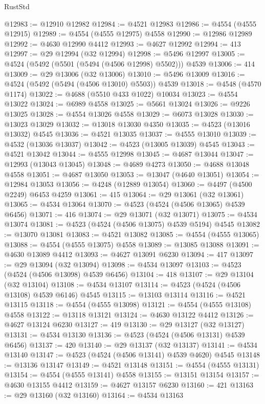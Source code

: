 \begin{lexlean}{RustStd}
\begin{coremodule}
@12983 := @12910 @12982
@12984 := @4521 @12983
@12986 := @4554 (@4555 @12915)
@12989 := @4554 (@4555 @12975) @4558
@12990 := @12986 @12989
@12992 := @4630 @12990 @4412
@12993 := @4627 @12992
@12994 := 413
@12997 := @29 @12994 (@32 @12994)
@12998 := @5496 @12997
@13005 := @4524 (@5492 (@5501 (@5494 (@4506 @12998) @5502))) @4539
@13006 := 414
@13009 := @29 @13006 (@32 @13006)
@13010 := @5496 @13009
@13016 := @4524 (@5492 (@5494 (@4506 @13010) @5503)) @4539
@13018 := @4548 (@4570 @1174)
@13022 := @4688 (@5510 @433 @1022) @10034
@13023 := @4554 @13022
@13024 := @6989 @4558
@13025 := @5661 @13024
@13026 := @9226 @13025
@13028 := @4554 @13026 @4558
@13029 := @6073 @13028
@13030 := @13023 @13029
@13032 := @13018 @13030 @4350
@13035 := @4523 (@13016 @13032) @4545
@13036 := @4521 @13035
@13037 := @4555 @13010
@13039 := @4532 (@13036 @13037)
@13042 := @4523 (@13005 @13039) @4545
@13043 := @4521 @13042
@13044 := @4555 @12998
@13045 := @4687 @13044
@13047 := @12993 (@13043 @13045)
@13048 := @4689 @4273
@13050 := @4688 @13048 @4558
@13051 := @4687 @13050
@13053 := @13047 (@4640 @13051)
@13054 := @12984 @13053
@13056 := @4248 (@12889 @13054)
@13060 := @4497 (@4500 @2249) @6453 @4259
@13061 := 415
@13064 := @29 @13061 (@32 @13061)
@13065 := @4534 @13064
@13070 := @4523 (@4524 (@4506 @13065) @4539 @6456)
@13071 := 416
@13074 := @29 @13071 (@32 @13071)
@13075 := @4534 @13074
@13081 := @4523 (@4524 (@4506 @13075) @4539 @5194) @4545
@13082 := @13070 @13081
@13083 := @4521 @13082
@13085 := @4554 (@4555 @13065)
@13088 := @4554 (@4555 @13075) @4558
@13089 := @13085 @13088
@13091 := @4630 @13089 @4412
@13093 := @4627 @13091 @6230
@13094 := 417
@13097 := @29 @13094 (@32 @13094)
@13098 := @4534 @13097
@13103 := @4523 (@4524 (@4506 @13098) @4539 @6456)
@13104 := 418
@13107 := @29 @13104 (@32 @13104)
@13108 := @4534 @13107
@13114 := @4523 (@4524 (@4506 @13108) @4539 @6146) @4545
@13115 := @13103 @13114
@13116 := @4521 @13115
@13118 := @4554 (@4555 @13098)
@13121 := @4554 (@4555 @13108) @4558
@13122 := @13118 @13121
@13124 := @4630 @13122 @4412
@13126 := @4627 @13124 @6230
@13127 := 419
@13130 := @29 @13127 (@32 @13127)
@13131 := @4534 @13130
@13136 := @4523 (@4524 (@4506 @13131) @4539 @6456)
@13137 := 420
@13140 := @29 @13137 (@32 @13137)
@13141 := @4534 @13140
@13147 := @4523 (@4524 (@4506 @13141) @4539 @4620) @4545
@13148 := @13136 @13147
@13149 := @4521 @13148
@13151 := @4554 (@4555 @13131)
@13154 := @4554 (@4555 @13141) @4558
@13155 := @13151 @13154
@13157 := @4630 @13155 @4412
@13159 := @4627 @13157 @6230
@13160 := 421
@13163 := @29 @13160 (@32 @13160)
@13164 := @4534 @13163

\end{coremodule}
\end{lexlean}
